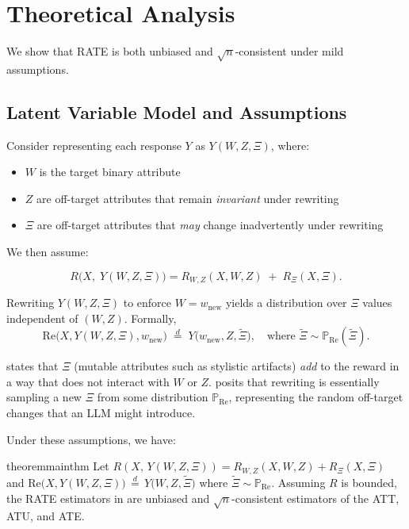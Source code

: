 \section{Theoretical Analysis}
\label{sec:theory}

We show that RATE is both unbiased and $\sqrt{n}$-consistent under mild assumptions.

\subsection{Latent Variable Model and Assumptions}

Consider representing each response $Y$ as $Y(W, Z, \Xi)$, where:
\begin{itemize}
    \item $W$ is the target binary attribute
    \item $Z$ are off-target attributes that remain \emph{invariant} under rewriting
    \item $\Xi$ are off-target attributes that \emph{may} change inadvertently under rewriting
\end{itemize}

We then assume:

\begin{assumption}
\label{assump:additive}
\[
R\bigl(X,\;Y(W,Z,\Xi)\bigr) = R_{W,Z}(X,W,Z) \;+\; R_{\Xi}(X,\Xi).
\]
\end{assumption}

\begin{assumption}
\label{assump:rewrite_dist}
Rewriting $Y(W,Z,\Xi)$ to enforce $W=w_{\text{new}}$ yields a distribution over $\Xi$ values independent of $(W,Z)$. Formally,
\[
\text{Re}\bigl(X, Y(W,Z,\Xi), w_{\text{new}} \bigr) \;\stackrel{d}{=}\; Y\bigl(w_{\text{new}},Z,\widetilde{\Xi}\bigr),
\quad\text{where } \widetilde{\Xi} \sim \mathbb{P}_{\mathrm{Re}}(\widetilde{\Xi}).
\]
\end{assumption}
\noindent
{} states that $\Xi$ (mutable attributes such as stylistic artifacts) \emph{add} to the reward in a way that does not interact with $W$ or $Z$.  posits that rewriting is essentially sampling a new $\Xi$ from some distribution $\mathbb{P}_{\mathrm{Re}}$, representing the random off-target changes that an LLM might introduce.

Under these assumptions, we have:

\begin{restatable}{theorem}{mainthm}
\label{thm:mainthm}
Let $R(X,\,Y(W,Z,\Xi)) = R_{W,Z}(X,W,Z) + R_{\Xi}(X,\Xi)$ and
\(
\text{Re}\bigl(X, Y(W,Z,\Xi)\bigr) \,\stackrel{d}{=}\, Y\bigl(W,Z,\tilde{\Xi}\bigr)
\)
where
\(
\tilde{\Xi} \sim \mathbb{P}_{\mathrm{Re}}
\).
Assuming $R$ is bounded, the RATE estimators in  are unbiased and $\sqrt{n}$-consistent estimators of the ATT, ATU, and ATE.
\end{restatable}

